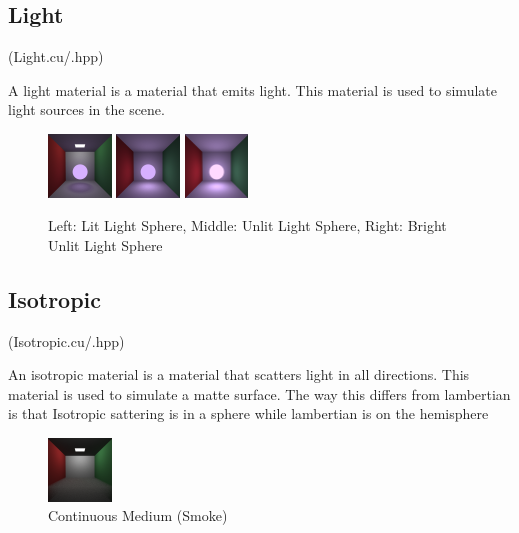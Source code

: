 \documentclass{article}
\begin{document}
    \subsection{Light}
    (Light.cu/.hpp)\par
    A light material is a material that emits light. This material is used to simulate light sources in the scene. \par
    \begin{figure}[H]
        \centering
        \includegraphics[width=0.15\textwidth]{samples/LightSphereLit.png}
        \includegraphics[width=0.15\textwidth]{samples/LightSphereUnlit.png}
        \includegraphics[width=0.15\textwidth]{samples/LightSphereUnlitBright.png}
        \caption{Left: Lit Light Sphere, Middle: Unlit Light Sphere, Right: Bright Unlit Light Sphere}
    \end{figure}


    \subsection{Isotropic}
    (Isotropic.cu/.hpp)\par
    An isotropic material is a material that scatters light in all directions. This material is used to simulate a matte surface. The way this differs from lambertian is that Isotropic sattering is in a sphere while lambertian is on the hemisphere \par
    \begin{figure}[H]
        \centering
        \includegraphics[width=0.15\textwidth]{samples/WeGetItYouVape.png}
        \caption{Continuous Medium (Smoke)}
    \end{figure}
\end{document}
